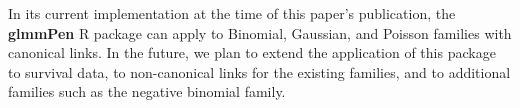 In its current implementation at the time of this paper's publication, the \textbf{glmmPen} R package can apply to Binomial, Gaussian, and Poisson families with canonical links. In the future, we plan to extend the application of this package to survival data, to non-canonical links for the existing families, and to additional families such as the negative binomial family. 











\address{Hillary M. Heiling\\
  University of North Carolina Chapel Hill\\
  }

\address{Naim U. Rashid\\
  University of North Carolina Chapel Hill\\
  }

\address{Quefeng Li\\
  University of North Carolina Chapel Hill\\
  }

\address{Joseph G. Ibrahim\\
  University of North Carolina Chapel Hill\\
  }

  